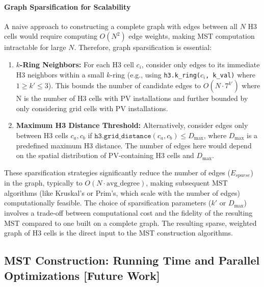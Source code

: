 \paragraph{Graph Sparsification for Scalability}
A naive approach to constructing a complete graph with edges between all $N$ H3 cells would require computing $O(N^2)$ edge weights, making MST computation intractable for large $N$. Therefore, graph sparsification is essential:
\begin{enumerate}
    \item \textbf{$k$-Ring Neighbors:} For each H3 cell $c_i$, consider only edges to its immediate H3 neighbors within a small $k$-ring (e.g., using \texttt{h3.k\_ring(}$c_i$\texttt{, k\_val)} where $1 \geq k' \leq 3$). 
    This bounds the number of candidate edges to $O(N \cdot 7^{k'})$ where N is the number of H3 cells with PV installations and further bounded by only considering grid cells with PV installations.
    \item \textbf{Maximum H3 Distance Threshold:} Alternatively, consider edges only between H3 cells $c_a, c_b$ if $\texttt{h3.grid\_distance}(c_a, c_b) \leq D_{\max}$, where $D_{\max}$ is a predefined maximum H3 distance. 
    The number of edges here would depend on the spatial distribution of PV-containing H3 cells and $D_{\max}$.
\end{enumerate}
These sparsification strategies significantly reduce the number of edges ($E_{sparse}$) in the graph, typically to $O(N \cdot \text{avg\_degree})$, making subsequent MST algorithms (like Kruskal's or Prim's, which scale with the number of edges) computationally feasible. 
The choice of sparsification parameters ($k'$ or $D_{\max}$) involves a trade-off between computational cost and the fidelity of the resulting MST compared to one built on a complete graph.
The resulting sparse, weighted graph of H3 cells is the direct input to the MST construction algorithms. 

\subsection{MST Construction: Running Time and Parallel Optimizations [Future Work]}
\label{subsec:mst_construction}

